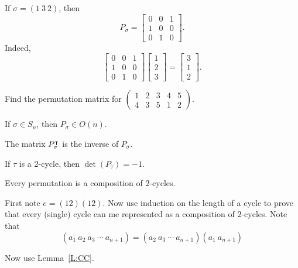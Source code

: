 \documentclass{ximera}
\begin{document}
\begin{example}
  If $\sigma = (1\ 3\ 2)$, then
  \[
  P_\sigma =
  \begin{bmatrix}
    0 & 0 & 1 \\
    1 & 0 & 0 \\
    0  & 1 & 0
  \end{bmatrix}.
  \]
  Indeed,
  \[
  \begin{bmatrix}
    0 & 0 & 1 \\
    1 & 0 & 0 \\
    0  & 1 & 0
  \end{bmatrix}
  \begin{bmatrix}
    1 \\
    2 \\
    3
  \end{bmatrix}
  =
  \begin{bmatrix}
    3 \\
    1 \\
    2
  \end{bmatrix}.
  \]
\end{example}


\begin{exercise}
  Find the permutation matrix for $\left(\begin{smallmatrix}
    1 & 2 & 3 & 4 & 5\\
    4 & 3 & 5 & 1 & 2
  \end{smallmatrix}\right)$.
\end{exercise}


\begin{lemma}
  If $\sigma \in S_n$, then $P_\sigma \in O(n)$.
  \begin{sketch}
    The matrix $P_\sigma^\intercal$ is the inverse of $P_\sigma$.
  \end{sketch}
\end{lemma}

\begin{corollary}
  If $\tau$ is a $2$-cycle, then $\det(P_\tau) = -1$.
\end{corollary}





\begin{lemma}
  Every permutation is a composition of $2$-cycles.
  \begin{sketch}
    First note $e = (12)(12)$. Now use induction on the length of a
    cycle to prove that every (single) cycle can me represented as a
    composition of $2$-cycles. Note that
    \[
    (a_1 \ a_2 \ a_3 \ \cdots \ a_{n+1}) = (a_2 \ a_3 \ \cdots \ a_{n+1}) (a_1 \ a_{n+1}) 
    \]

    Now use Lemma~\ref{L:CC}.
  \end{sketch}
\end{lemma}
\end{document}
